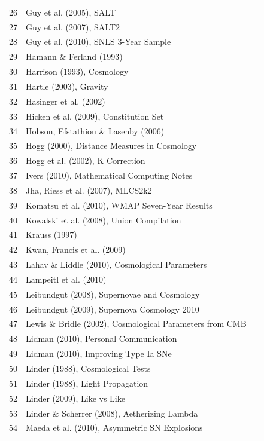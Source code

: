 \documentclass{article}
\newcommand{\done}{\textcolor{green!60!black}{\ding{51}}}
\begin{document}
\begin{longtable}{|r|p{8cm}|c|}
26 & Guy et al. (2005), SALT & \done \\
27 & Guy et al. (2007), SALT2 & \done \\
28 & Guy et al. (2010), SNLS 3-Year Sample & \done \\
29 & Hamann \& Ferland (1993) & \done \\
30 & Harrison (1993), Cosmology & \done \\
31 & Hartle (2003), Gravity & \done \\
32 & Hasinger et al. (2002) & \done \\
33 & Hicken et al. (2009), Constitution Set & \done \\
34 & Hobson, Efstathiou \& Lasenby (2006) & \done \\
35 & Hogg (2000), Distance Measures in Cosmology & \done \\
36 & Hogg et al. (2002), K Correction & \done \\
37 & Ivers (2010), Mathematical Computing Notes & \done \\
38 & Jha, Riess et al. (2007), MLCS2k2 & \done \\
39 & Komatsu et al. (2010), WMAP Seven-Year Results & \done \\
40 & Kowalski et al. (2008), Union Compilation & \done \\
41 & Krauss (1997) & \done \\
42 & Kwan, Francis et al. (2009) & \done \\
43 & Lahav \& Liddle (2010), Cosmological Parameters & \done \\
44 & Lampeitl et al. (2010) & \done \\
45 & Leibundgut (2008), Supernovae and Cosmology & \done \\
46 & Leibundgut (2009), Supernova Cosmology 2010 & \done \\
47 & Lewis \& Bridle (2002), Cosmological Parameters from CMB & \done \\
48 & Lidman (2010), Personal Communication & \done \\
49 & Lidman (2010), Improving Type Ia SNe & \done \\
50 & Linder (1988), Cosmological Tests & \done \\
51 & Linder (1988), Light Propagation & \done \\
52 & Linder (2009), Like vs Like & \done \\
53 & Linder \& Scherrer (2008), Aetherizing Lambda & \done \\
54 & Maeda et al. (2010), Asymmetric SN Explosions & \done \\

\end{longtable}
\end{document}
